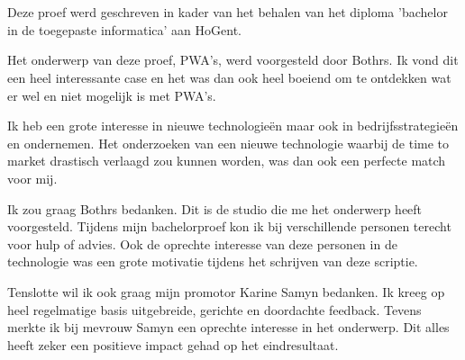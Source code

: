 
\chapter*{}
\label{ch:voorwoord}


Deze proef werd geschreven in kader van het behalen van het diploma 'bachelor in de toegepaste informatica' aan HoGent.

Het onderwerp van deze proef, PWA's, werd voorgesteld door Bothrs. Ik vond dit een heel interessante case en het was dan ook heel boeiend om te ontdekken wat er wel en niet mogelijk is met PWA's.

Ik heb een grote interesse in nieuwe technologieën maar ook in bedrijfsstrategieën en ondernemen. Het onderzoeken van een nieuwe technologie waarbij de time to market drastisch verlaagd zou kunnen worden, was dan ook een perfecte match voor mij. 

Ik zou graag Bothrs bedanken. Dit is de studio die me het onderwerp heeft voorgesteld. 
Tijdens mijn bachelorproef kon ik bij verschillende personen terecht voor hulp of advies. Ook de oprechte interesse van deze personen in de technologie was een grote motivatie tijdens het schrijven van deze scriptie.

Tenslotte wil ik ook graag mijn promotor Karine Samyn bedanken. Ik kreeg op heel regelmatige basis uitgebreide, gerichte en doordachte feedback. Tevens merkte ik bij mevrouw Samyn een oprechte interesse in het onderwerp. Dit alles heeft zeker een positieve impact gehad op het eindresultaat.